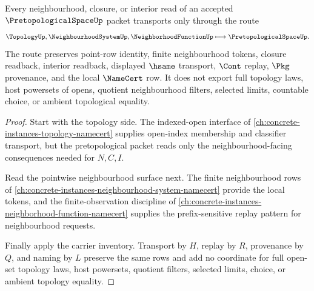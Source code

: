 \begin{theorem}
\label{thm:pretopological-space-neighbourhood-transport}
Every neighbourhood, closure, or interior read of an accepted $\PretopologicalSpaceUp$ packet transports only through the route
$$
\TopologyUp,\NeighbourhoodSystemUp,\NeighborhoodFunctionUp \longmapsto \PretopologicalSpaceUp .
$$
The route preserves point-row identity, finite neighbourhood tokens, closure readback, interior readback, displayed $\hsame$ transport, $\Cont$ replay, $\Pkg$ provenance, and the local $\NameCert$ row. It does not export full topology laws, host powersets of opens, quotient neighbourhood filters, selected limits, countable choice, or ambient topological equality.
\end{theorem}
\begin{proof}
Start with the topology side. The indexed-open interface of \autoref{ch:concrete-instances-topology-namecert} supplies open-index membership and classifier transport, but the pretopological packet reads only the neighbourhood-facing consequences needed for $N,C,I$.

Read the pointwise neighbourhood surface next. The finite neighbourhood rows of \autoref{ch:concrete-instances-neighbourhood-system-namecert} provide the local tokens, and the finite-observation discipline of \autoref{ch:concrete-instances-neighborhood-function-namecert} supplies the prefix-sensitive replay pattern for neighbourhood requests.

Finally apply the carrier inventory. Transport by $H$, replay by $R$, provenance by $Q$, and naming by $L$ preserve the same rows and add no coordinate for full open-set topology laws, host powersets, quotient filters, selected limits, choice, or ambient topology equality.
\end{proof}


\begin{closurestatus}{\PretopologicalSpaceUp}
  \theoryclosure{\seedClosure}
  \formalstatus{\unformalizedV}
\end{closurestatus}
